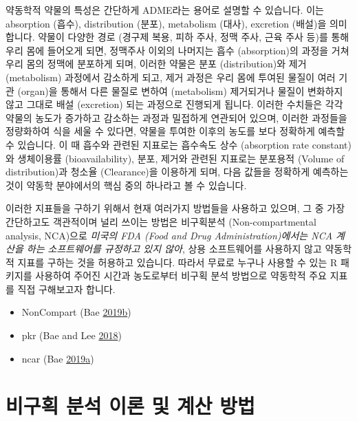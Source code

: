 \documentclass[12pt,]{krantz}
\providecommand{\tightlist}{%
  \setlength{\itemsep}{0pt}\setlength{\parskip}{0pt}}
\begin{document}
약동학적 약물의 특성은 간단하게 ADME라는 용어로 설명할 수 있습니다.
이는 absorption (흡수), distribution (분포), metabolism (대사), excretion (배설)을 의미합니다.
약물이 다양한 경로 (경구제 복용, 피하 주사, 정맥 주사, 근육 주사 등)를 통해 우리 몸에 들어오게 되면, 정맥주사 이외의 나머지는 흡수 (absorption)의 과정을 거쳐 우리 몸의 정맥에 분포하게 되며, 이러한 약물은 분포 (distribution)와 제거 (metabolism) 과정에서 감소하게 되고, 제거 과정은 우리 몸에 투여된 물질이 여러 기관 (organ)을 통해서 다른 물질로 변하여 (metabolism) 제거되거나 물질이 변화하지 않고 그대로 배설 (excretion) 되는 과정으로 진행되게 됩니다.
이러한 수치들은 각각 약물의 농도가 증가하고 감소하는 과정과 밀접하게 연관되어 있으며, 이러한 과정들을 정량화하여 식을 세울 수 있다면, 약물을 투여한 이후의 농도를 보다 정확하게 예측할 수 있습니다.
이 때 흡수와 관련된 지표로는 흡수속도 상수 (absorption rate constant)와 생체이용률 (bioavailability), 분포, 제거와 관련된 지표로는 분포용적 (Volume of distribution)과 청소율 (Clearance)을 이용하게 되며, 다음 값들을 정확하게 예측하는 것이 약동학 분야에서의 핵심 중의 하나라고 볼 수 있습니다.

이러한 지표들을 구하기 위해서 현재 여러가지 방법들을 사용하고 있으며, 그 중 가장 간단하고도 객관적이며 널리 쓰이는 방법은 비구획분석 (Non-compartmental analysis, NCA)으로 \emph{미국의 FDA (Food and Drug Administration)에서는 NCA 계산을 하는 소프트웨어를 규정하고 있지 않아}, 상용 소프트웨어를 사용하지 않고 약동학적 지표를 구하는 것을 허용하고 있습니다.
따라서 무료로 누구나 사용할 수 있는 R 패키지를 사용하여 주어진 시간과 농도로부터 비구획 분석 방법으로 약동학적 주요 지표를 직접 구해보고자 합니다.

\begin{itemize}
\tightlist
\item
  NonCompart (Bae \protect\hyperlink{ref-R-NonCompart}{2019}\protect\hyperlink{ref-R-NonCompart}{b})
\item
  pkr (Bae and Lee \protect\hyperlink{ref-R-pkr}{2018})
\item
  ncar (Bae \protect\hyperlink{ref-R-ncar}{2019}\protect\hyperlink{ref-R-ncar}{a})
\end{itemize}

\hypertarget{ncar-method}{%
\section{비구획 분석 이론 및 계산 방법}\label{ncar-method}}
\end{document}
